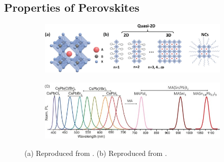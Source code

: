 \subsection{Properties of Perovskites}

\begin{figure}[htbp]
    \centering
    \begin{subfigure}[b]{\textwidth}
    \centering
        \includegraphics[width=0.85\linewidth]{chapters/introduction/image/perovskite_structure.jpg}
        \caption{}
        \label{fig:ch1:perovskite structure}
    \end{subfigure}

    \vspace{0.5cm}
    
    \begin{subfigure}[b]{\textwidth}
    \centering
        \includegraphics[width=0.85\linewidth]{chapters/introduction/image/bandgap_tunability.jpg}
        \caption{}
        \label{fig:ch1:bandgap_tunability}
    \end{subfigure}
    
    \caption{(a) Reproduced from \cite{Lei2021MetalApplications}. (b) Reproduced from \cite{Gholipour2020BandgapMaterials}.}
    \label{fig:ch1:perovskite_strucutre_bandgap}
\end{figure}



